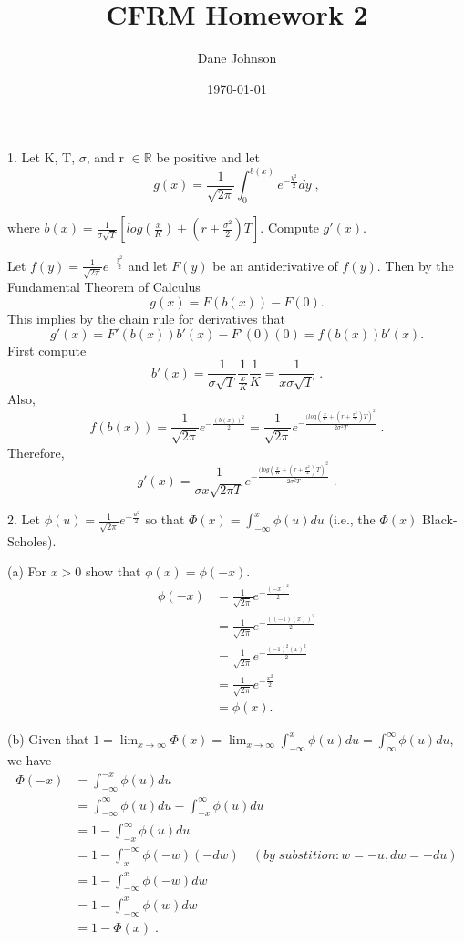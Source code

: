 \documentclass[11pt]{article}
\begin{document}
\title{CFRM Homework 2}
\author{Dane Johnson}
\date{\today}
\maketitle

1. Let K, T, $\sigma$, and r $\in \mathbb{R}$ be positive and let
$$ g(x) = \frac{1}{\sqrt{2\pi}} \int_{0}^{b(x)} e^{-\frac{y^2}{2}} dy \;,$$

where $b(x) = \frac{1}{\sigma\sqrt{T}} [log(\frac{x}{K}) + (r + \frac{\sigma^2}{2})T]$. Compute $g'(x)$.

Let $f(y) = \frac{1}{\sqrt{2\pi}} e^{-\frac{y^2}{2}}$ and let $F(y)$ be an antiderivative of $f(y)$. Then by the Fundamental Theorem of Calculus
$$g(x) = F(b(x)) - F(0).$$
This implies by the chain rule for derivatives that
$$g'(x) = F'(b(x))b'(x) - F'(0)(0) = f(b(x))b'(x).$$
First compute
$$b'(x) = \frac{1}{\sigma \sqrt{T}} \frac{1}{\frac{x}{K}} \frac{1}{K} = \frac{1}{x\sigma \sqrt{T}}\;.$$
Also,
$$ f(b(x)) =\frac{1}{\sqrt{2\pi}} e^{-\frac{(b(x))^2}{2}} = \frac{1}{\sqrt{2\pi}} e^{-\frac{(log(\frac{x}{K} + (r+\frac{\sigma^2}{2})T)^2}{2\sigma^2T}}\;.$$
Therefore,
$$g'(x) = \frac{1}{\sigma x \sqrt{2\pi T}} e^{-\frac{(log(\frac{x}{K} + (r+\frac{\sigma^2}{2})T)^2}{2\sigma^2T}}\;.$$

2. Let $\phi(u) = \frac{1}{\sqrt{2\pi}} e^{-\frac{u^2}{2}}$ so that $\Phi(x) = \int_{-\infty}^{x} \phi(u) du$	(i.e., the $\Phi(x)$ Black-Scholes).

(a) For $x>0$ show that $\phi(x) = \phi(-x)$.
\begin{align*}
\phi(-x) & = \frac{1}{\sqrt{2\pi}} e^{-\frac{(-x)^2}{2}} \\
& =\frac{1}{\sqrt{2\pi}} e^{-\frac{((-1)(x))^2}{2}} \\
& =\frac{1}{\sqrt{2\pi}} e^{-\frac{(-1)^2(x)^2}{2}} \\
& =\frac{1}{\sqrt{2\pi}} e^{-\frac{x^2}{2}} \\
& = \phi(x).
\end{align*}


(b) Given that $1 = \lim_{x\to\infty} \Phi(x) = \lim_{x\to\infty} \int_{-\infty}^{x} \phi(u) du = \int_{\infty}^{\infty} \phi(u) du$, we have
\begin{align*}
\Phi(-x) & = \int_{-\infty}^{-x} \phi(u) du \\
& = \int_{-\infty}^{\infty} \phi(u) du - \int_{-x}^{\infty} \phi(u) du \\
& = 1 - \int_{-x}^{\infty} \phi(u) du \\
& = 1 - \int_{x}^{-\infty} \phi(-w)(-dw)\quad (by \; substition : w = -u, dw = -du) \\
& = 1 - \int_{-\infty}^{x} \phi(-w) dw \\
& = 1 - \int_{-\infty}^{x} \phi(w) dw \\
& = 1 - \Phi(x)\;.
\end{align*}
\end{document}
